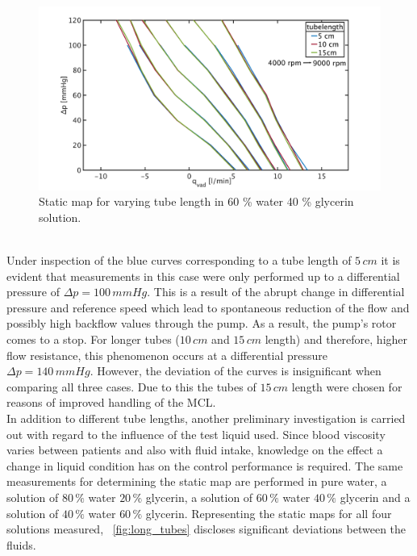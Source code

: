 \begin{figure}[ht]
  \centering
  \includegraphics[width=\textwidth]{images/chapt_4/60w40g_tube_length_new.pdf}
  \caption[Static map for different tube length in 60 \% water 40 \% glycerin solution]{Static map for varying tube length in 60 \% water 40 \% glycerin solution.}
  \label{fig:60w_40g}
\end{figure}
\\Under inspection of the blue curves corresponding to a tube length of $5\, cm$ it is evident that measurements in this case were only performed up to a differential pressure of $\Delta{p}=100 \, mmHg$. This is a result of the abrupt change in differential pressure and reference speed which lead to spontaneous reduction of the flow and possibly high backflow values through the pump. As a result, the pump's rotor comes to a stop. For longer tubes ($10\, cm$ and $15\, cm$ length) and therefore, higher flow resistance, this phenomenon occurs at a differential pressure $\Delta{p}=140\, mmHg$. However, the deviation of the curves is insignificant when comparing all three cases. Due to this the tubes of $15\, cm$ length were chosen for reasons of improved handling of the MCL.
\\In addition to different tube lengths, another preliminary investigation is carried out with regard to the influence of the test liquid used. Since blood viscosity varies between patients and also with fluid intake, knowledge on the effect a change in liquid condition has on the control performance is required. The same measurements for determining the static map are performed in pure water, a solution of $80\, \%$ water $20\, \%$ glycerin, a solution of $60\, \%$ water $40\, \%$ glycerin and a solution of $40\, \%$ water $60\, \%$ glycerin. Representing the static maps for all four solutions measured, \figurename~\ref{fig:long_tubes} discloses significant deviations between the fluids.
